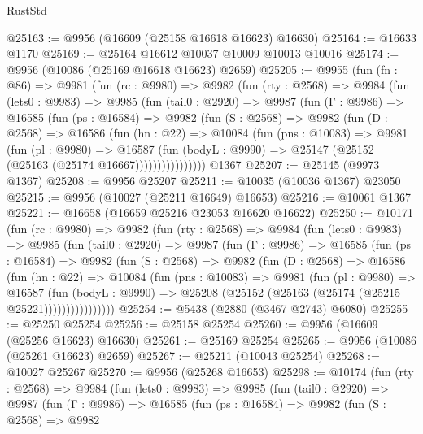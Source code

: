\begin{lexlean}{RustStd}
\begin{coremodule}
@25163 := @9956 (@16609 (@25158 @16618 @16623) @16630)
@25164 := @16633 @1170
@25169 := @25164 @16612 @10037 @10009 @10013 @10016
@25174 := @9956 (@10086 (@25169 @16618 @16623) @2659)
@25205 := @9955
    (fun (fn : @86) =>
    @9981
      (fun (rc : @9980) =>
      @9982
        (fun (rty : @2568) =>
        @9984
          (fun (lets0 : @9983) =>
          @9985
            (fun (tail0 : @2920) =>
            @9987
              (fun (Γ : @9986) =>
              @16585
                (fun (ps : @16584) =>
                @9982
                  (fun (S : @2568) =>
                  @9982
                    (fun (D : @2568) =>
                    @16586
                      (fun (hn : @22) =>
                      @10084
                        (fun (pns : @10083) =>
                        @9981
                          (fun (pl : @9980) =>
                          @16587
                            (fun (bodyL : @9990) =>
                            @25147 (@25152 (@25163 (@25174 @16667))))))))))))))))
    @1367
@25207 := @25145 (@9973 @1367)
@25208 := @9956 @25207
@25211 := @10035 (@10036 @1367) @23050
@25215 := @9956 (@10027 (@25211 @16649) @16653)
@25216 := @10061 @1367
@25221 := @16658 (@16659 @25216 @23053 @16620 @16622)
@25250 := @10171
    (fun (rc : @9980) =>
    @9982
      (fun (rty : @2568) =>
      @9984
        (fun (lets0 : @9983) =>
        @9985
          (fun (tail0 : @2920) =>
          @9987
            (fun (Γ : @9986) =>
            @16585
              (fun (ps : @16584) =>
              @9982
                (fun (S : @2568) =>
                @9982
                  (fun (D : @2568) =>
                  @16586
                    (fun (hn : @22) =>
                    @10084
                      (fun (pns : @10083) =>
                      @9981
                        (fun (pl : @9980) =>
                        @16587
                          (fun (bodyL : @9990) =>
                          @25208 (@25152 (@25163 (@25174 (@25215 @25221))))))))))))))))
@25254 := @5438 (@2880 (@3467 @2743) @6080)
@25255 := @25250 @25254
@25256 := @25158 @25254
@25260 := @9956 (@16609 (@25256 @16623) @16630)
@25261 := @25169 @25254
@25265 := @9956 (@10086 (@25261 @16623) @2659)
@25267 := @25211 (@10043 @25254)
@25268 := @10027 @25267
@25270 := @9956 (@25268 @16653)
@25298 := @10174
    (fun (rty : @2568) =>
    @9984
      (fun (lets0 : @9983) =>
      @9985
        (fun (tail0 : @2920) =>
        @9987
          (fun (Γ : @9986) =>
          @16585
            (fun (ps : @16584) =>
            @9982
              (fun (S : @2568) =>
              @9982

\end{coremodule}
\end{lexlean}

